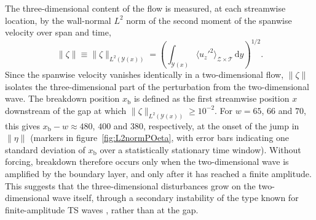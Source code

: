 \documentclass[lineno]{jfm}
\begin{document}
The three-dimensional content of the flow is measured, at each streamwise location, by the wall-normal $L^2$ norm of the second moment of the spanwise velocity over span and time,
\begin{equation}\label{eq:zetaNorm}
	\|\zeta\|\equiv\|\zeta\|_{L^2(\mathcal{Y}(x))}= {\left( \int_{\mathcal{Y}(x)} {\langle {u_z'}^2\rangle}_{\mathcal{Z}\times\mathcal{T}}\, \mathrm{d}y \right)}^{1/2}.
\end{equation}
Since the spanwise velocity vanishes identically in a two-dimensional flow, $\|\zeta\|$ isolates the three-dimensional part of the perturbation from the two-dimensional wave. The breakdown position $x_\mathrm{b}$ is defined as the first streamwise position $x$ downstream of the gap at which $\|\zeta\|_{L^2(\mathcal{Y}(x))}\geq10^{-2}$. For $w=65$, $66$ and $70$, this gives $x_\mathrm{b}-w\approx480$, $400$ and $380$, respectively, at the onset of the jump in $\|\eta\|$ (markers in figure~\ref{fig:L2normPOeta}, with error bars indicating one standard deviation of $x_\mathrm{b}$ over a statistically stationary time window). Without forcing, breakdown therefore occurs only when the two-dimensional wave is amplified by the boundary layer, and only after it has reached a finite amplitude. This suggests that the three-dimensional disturbances grow on the two-dimensional wave itself, through a secondary instability of the type known for finite-amplitude \ac{TS} waves \citep{herbert1988}, rather than at the gap.
\end{document}
